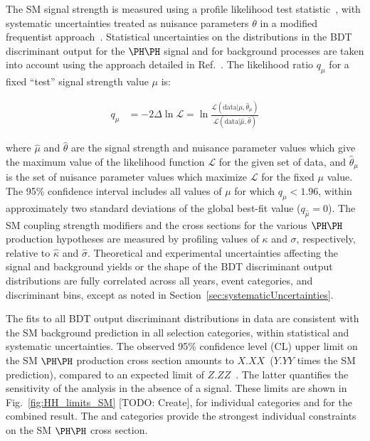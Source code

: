 The SM signal strength is measured using a profile likelihood test
statistic~\cite{Cowan:2010js}, with systematic uncertainties treated as nuisance
parameters $\theta$ in a modified frequentist approach~\cite{ATL-PHYS-PUB-2011-011}.
Statistical uncertainties on the distributions in the BDT discriminant output for the $\HH$ signal and for background processes
are taken into account using the approach detailed in Ref.~\cite{Barlow:1993dm}.
The likelihood ratio $q_{\mu}$ for a fixed ``test'' signal strength value $\mu$ is:
\begin{linenomath}
\begin{equation*}
  \begin{aligned}
    q_{\mu}  &  = -2 \Delta \ln \mathcal{L} = \ln \frac{\mathcal{L}(\mathrm{data}|\mu,\hat{\theta}_{\mu})}{\mathcal{L}(\mathrm{data}|\hat{\mu},\hat{\theta})}
  \end{aligned}
\end{equation*}
\end{linenomath}
where $\hat{\mu}$ and $\hat{\theta}$ are the signal strength and nuisance
parameter values which give the maximum value of the likelihood function $\mathcal{L}$
for the given set of data, and $\hat{\theta}_{\mu}$ is the set of nuisance
parameter values which maximize $\mathcal{L}$ for the fixed $\mu$ value.
The 95\% confidence interval includes all values of $\mu$ for which $q_{\mu} < 1.96$,
within approximately two standard deviations of the global best-fit value ($q_{\hat{\mu}} = 0$).
The SM coupling strength modifiers and the cross sections for the various $\HH$ production hypotheses
are measured by profiling values of $\kappa$ and $\sigma$, respectively,
relative to $\hat{\kappa}$ and $\hat{\sigma}$.
Theoretical and experimental uncertainties affecting the signal and
background yields or the shape of the BDT discriminant output distributions are fully
correlated across all years, event categories, and discriminant bins,
except as noted in Section~\ref{sec:systematicUncertainties}.

The fits to all BDT output discriminant distributions in data are consistent with the
SM background prediction in all selection categories, within statistical and systematic uncertainties.
The observed 95\% confidence level (CL) upper limit on the SM $\HH$ production cross section
amounts to $X.XX$~\pb ($Y.YY$ times the SM prediction), compared to an
expected limit of $Z.ZZ$~\pb.
The latter quantifies the sensitivity of the analysis in the absence of a signal.
These limits are shown in Fig.~\ref{fig:HH_limits_SM} [TODO: Create],
for individual categories and for the combined result.
The \lttt and \lllnot categories provide the strongest individual
constraints on the SM $\HH$ cross section.

